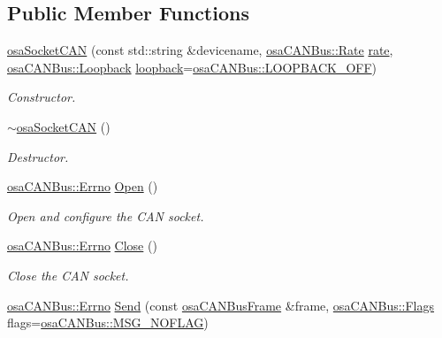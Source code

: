 \subsection*{Public Member Functions}
\begin{DoxyCompactItemize}
\item 
\hyperlink{classosa_socket_c_a_n_a3e7b2c117c7eea2007a36d3848ed0430}{osa\-Socket\-C\-A\-N} (const std\-::string \&devicename, \hyperlink{classosa_c_a_n_bus_ae977dbc0e1c16772395408c8e018fe6c}{osa\-C\-A\-N\-Bus\-::\-Rate} \hyperlink{classosa_c_a_n_bus_a4ff86a9ecf19161b1f34666888e0a331}{rate}, \hyperlink{classosa_c_a_n_bus_a992406c83a336e95fb4a09b0b13df786}{osa\-C\-A\-N\-Bus\-::\-Loopback} \hyperlink{classosa_c_a_n_bus_a724e9c478dd48908882e29f189d98968}{loopback}=\hyperlink{classosa_c_a_n_bus_a992406c83a336e95fb4a09b0b13df786ae2557509d0c1ac68029eeb6bdf6e703d}{osa\-C\-A\-N\-Bus\-::\-L\-O\-O\-P\-B\-A\-C\-K\-\_\-\-O\-F\-F})
\begin{DoxyCompactList}\small\item\em Constructor. \end{DoxyCompactList}\item 
\hyperlink{classosa_socket_c_a_n_ae0c2442fed8f94986b0729382c7e81bf}{$\sim$osa\-Socket\-C\-A\-N} ()
\begin{DoxyCompactList}\small\item\em Destructor. \end{DoxyCompactList}\item 
\hyperlink{classosa_c_a_n_bus_a6fa3e95ec4c36932d0640e40e0748fde}{osa\-C\-A\-N\-Bus\-::\-Errno} \hyperlink{classosa_socket_c_a_n_a5a8bb9db219c9f4072b5bcc357eeb847}{Open} ()
\begin{DoxyCompactList}\small\item\em Open and configure the C\-A\-N socket. \end{DoxyCompactList}\item 
\hyperlink{classosa_c_a_n_bus_a6fa3e95ec4c36932d0640e40e0748fde}{osa\-C\-A\-N\-Bus\-::\-Errno} \hyperlink{classosa_socket_c_a_n_a131308c6fa41ee200b5b1785f12c709b}{Close} ()
\begin{DoxyCompactList}\small\item\em Close the C\-A\-N socket. \end{DoxyCompactList}\item 
\hyperlink{classosa_c_a_n_bus_a6fa3e95ec4c36932d0640e40e0748fde}{osa\-C\-A\-N\-Bus\-::\-Errno} \hyperlink{classosa_socket_c_a_n_a59accc9278f0cbab72e578bb8d486a43}{Send} (const \hyperlink{classosa_c_a_n_bus_frame}{osa\-C\-A\-N\-Bus\-Frame} \&frame, \hyperlink{classosa_c_a_n_bus_a74fe35c6059237887431f3ccece7b21b}{osa\-C\-A\-N\-Bus\-::\-Flags} flags=\hyperlink{classosa_c_a_n_bus_a74fe35c6059237887431f3ccece7b21ba30f701fa6e0dba6e274540941ccd3978}{osa\-C\-A\-N\-Bus\-::\-M\-S\-G\-\_\-\-N\-O\-F\-L\-A\-G})

\end{DoxyCompactItemize}
